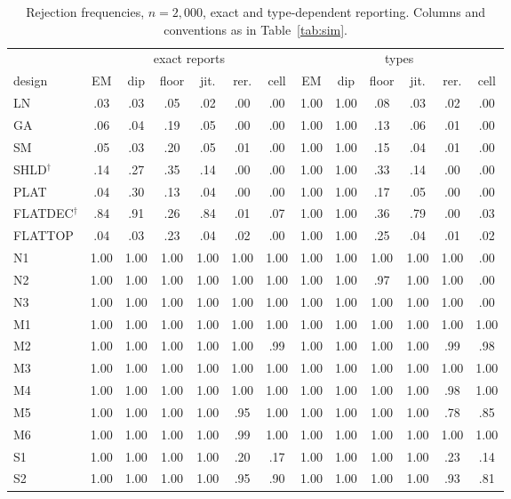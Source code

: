 \begin{table}[h]
\centering\footnotesize
\setlength{\tabcolsep}{4pt}
\caption{Rejection frequencies, $n=2{,}000$, exact and type-dependent reporting. Columns and conventions as in Table~\ref{tab:sim}.}\label{tab:S-sim2b}
\begin{tabular}{l*{6}{c}@{\hspace{10pt}}*{6}{c}}
\toprule
 & \multicolumn{6}{c}{exact reports} & \multicolumn{6}{c}{types}\\
\cmidrule(lr){2-7}\cmidrule(lr){8-13}
design & EM & dip & floor & jit. & rer. & cell & EM & dip & floor & jit. & rer. & cell\\
\midrule
LN & .03 & .03 & .05 & .02 & .00 & .00 & 1.00 & 1.00 & .08 & .03 & .02 & .00 \\
GA & .06 & .04 & .19 & .05 & .00 & .00 & 1.00 & 1.00 & .13 & .06 & .01 & .00 \\
SM & .05 & .03 & .20 & .05 & .01 & .00 & 1.00 & 1.00 & .15 & .04 & .01 & .00 \\
SHLD$^\dagger$ & .14 & .27 & .35 & .14 & .00 & .00 & 1.00 & 1.00 & .33 & .14 & .00 & .00 \\
PLAT & .04 & .30 & .13 & .04 & .00 & .00 & 1.00 & 1.00 & .17 & .05 & .00 & .00 \\
FLATDEC$^\dagger$ & .84 & .91 & .26 & .84 & .01 & .07 & 1.00 & 1.00 & .36 & .79 & .00 & .03 \\
FLATTOP & .04 & .03 & .23 & .04 & .02 & .00 & 1.00 & 1.00 & .25 & .04 & .01 & .02 \\
\midrule
N1 & 1.00 & 1.00 & 1.00 & 1.00 & 1.00 & 1.00 & 1.00 & 1.00 & 1.00 & 1.00 & 1.00 & .00 \\
N2 & 1.00 & 1.00 & 1.00 & 1.00 & 1.00 & 1.00 & 1.00 & 1.00 & .97 & 1.00 & 1.00 & .00 \\
N3 & 1.00 & 1.00 & 1.00 & 1.00 & 1.00 & 1.00 & 1.00 & 1.00 & 1.00 & 1.00 & 1.00 & .00 \\
M1 & 1.00 & 1.00 & 1.00 & 1.00 & 1.00 & 1.00 & 1.00 & 1.00 & 1.00 & 1.00 & 1.00 & 1.00 \\
M2 & 1.00 & 1.00 & 1.00 & 1.00 & 1.00 & .99 & 1.00 & 1.00 & 1.00 & 1.00 & .99 & .98 \\
M3 & 1.00 & 1.00 & 1.00 & 1.00 & 1.00 & 1.00 & 1.00 & 1.00 & 1.00 & 1.00 & 1.00 & 1.00 \\
M4 & 1.00 & 1.00 & 1.00 & 1.00 & 1.00 & 1.00 & 1.00 & 1.00 & 1.00 & 1.00 & .98 & 1.00 \\
M5 & 1.00 & 1.00 & 1.00 & 1.00 & .95 & 1.00 & 1.00 & 1.00 & 1.00 & 1.00 & .78 & .85 \\
M6 & 1.00 & 1.00 & 1.00 & 1.00 & .99 & 1.00 & 1.00 & 1.00 & 1.00 & 1.00 & 1.00 & 1.00 \\
S1 & 1.00 & 1.00 & 1.00 & 1.00 & .20 & .17 & 1.00 & 1.00 & 1.00 & 1.00 & .23 & .14 \\
S2 & 1.00 & 1.00 & 1.00 & 1.00 & .95 & .90 & 1.00 & 1.00 & 1.00 & 1.00 & .93 & .81 \\
\bottomrule
\end{tabular}
\end{table}

